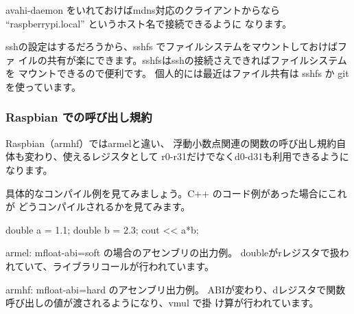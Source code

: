 \documentclass[mingoth,a4paper]{jsarticle}
\begin{document}
avahi-daemon をいれておけばmdns対応のクライアントからなら
``raspberrypi.local'' というホスト名で接続できるように
なります。

sshの設定はするだろうから、sshfs でファイルシステムをマウントしておけばファ
イルの共有が楽にできます。sshfsはsshの接続さえできればファイルシステムを
マウントできるので便利です。
個人的には最近はファイル共有は sshfs か git を使っています。

\subsubsection{Raspbian での呼び出し規約}

Raspbian（armhf）ではarmelと違い、
浮動小数点関連の関数の呼び出し規約自体も変わり、使えるレジスタとして
r0-r31だけでなくd0-d31も利用できるようになります。

具体的なコンパイル例を見てみましょう。C++ のコード例があった場合にこれが
どうコンパイルされるかを見てみます。
\begin{commandline}
  double a = 1.1;
  double b = 2.3;
  cout << a*b;
\end{commandline}

armel: mfloat-abi=soft の場合のアセンブリの出力例。
doubleがrレジスタで扱われていて、ライブラリコールが行われています。


armhf: mfloat-abi=hard のアセンブリ出力例。
ABIが変わり、dレジスタで関数呼び出しの値が渡されるようになり、vmul で掛
け算が行われています。

\end{document}
